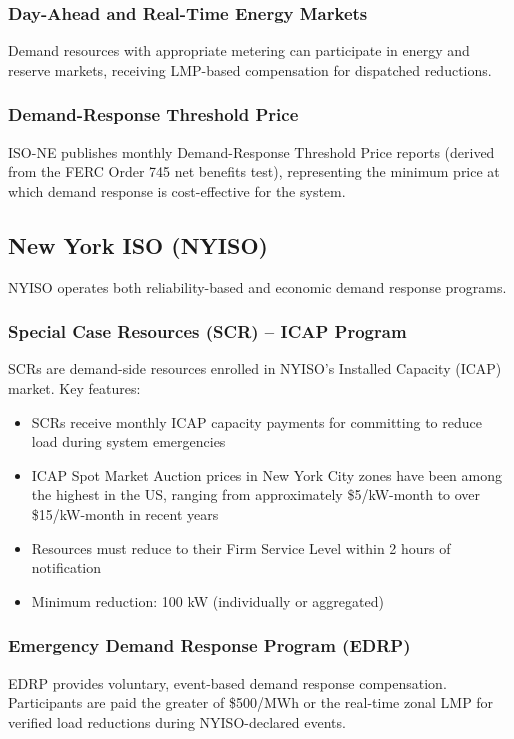 \documentclass[12pt]{article}
\begin{document}
\subsubsection{Day-Ahead and Real-Time Energy Markets}
Demand resources with appropriate metering can participate in energy and reserve markets, receiving LMP-based compensation for dispatched reductions.

\subsubsection{Demand-Response Threshold Price}
ISO-NE publishes monthly Demand-Response Threshold Price reports (derived from the FERC Order 745 net benefits test), representing the minimum price at which demand response is cost-effective for the system.

\subsection{New York ISO (NYISO)}

NYISO operates both reliability-based and economic demand response programs.

\subsubsection{Special Case Resources (SCR) -- ICAP Program}
SCRs are demand-side resources enrolled in NYISO's Installed Capacity (ICAP) market. Key features:
\begin{itemize}
    \item SCRs receive monthly ICAP capacity payments for committing to reduce load during system emergencies
    \item ICAP Spot Market Auction prices in New York City zones have been among the highest in the US, ranging from approximately \$5/kW-month to over \$15/kW-month in recent years
    \item Resources must reduce to their Firm Service Level within 2 hours of notification
    \item Minimum reduction: 100 kW (individually or aggregated)
\end{itemize}

\subsubsection{Emergency Demand Response Program (EDRP)}
EDRP provides voluntary, event-based demand response compensation. Participants are paid the greater of \$500/MWh or the real-time zonal LMP for verified load reductions during NYISO-declared events.
\end{document}
